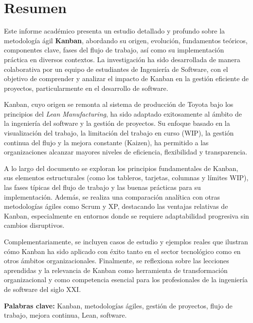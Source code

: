 \section*{Resumen}

Este informe académico presenta un estudio detallado y profundo sobre la metodología ágil \textbf{Kanban}, abordando su origen, evolución, fundamentos teóricos, componentes clave, fases del flujo de trabajo, así como su implementación práctica en diversos contextos. La investigación ha sido desarrollada de manera colaborativa por un equipo de estudiantes de Ingeniería de Software, con el objetivo de comprender y analizar el impacto de Kanban en la gestión eficiente de proyectos, particularmente en el desarrollo de software.

Kanban, cuyo origen se remonta al sistema de producción de Toyota bajo los principios del \textit{Lean Manufacturing}, ha sido adaptado exitosamente al ámbito de la ingeniería del software y la gestión de proyectos. Su enfoque basado en la visualización del trabajo, la limitación del trabajo en curso (WIP), la gestión continua del flujo y la mejora constante (Kaizen), ha permitido a las organizaciones alcanzar mayores niveles de eficiencia, flexibilidad y transparencia.

A lo largo del documento se exploran los principios fundamentales de Kanban, sus elementos estructurales (como los tableros, tarjetas, columnas y límites WIP), las fases típicas del flujo de trabajo y las buenas prácticas para su implementación. Además, se realiza una comparación analítica con otras metodologías ágiles como Scrum y XP, destacando las ventajas relativas de Kanban, especialmente en entornos donde se requiere adaptabilidad progresiva sin cambios disruptivos.

Complementariamente, se incluyen casos de estudio y ejemplos reales que ilustran cómo Kanban ha sido aplicado con éxito tanto en el sector tecnológico como en otros ámbitos organizacionales. Finalmente, se reflexiona sobre las lecciones aprendidas y la relevancia de Kanban como herramienta de transformación organizacional y como competencia esencial para los profesionales de la ingeniería de software del siglo XXI.

\vspace{0.5cm}
\noindent\textbf{Palabras clave:} Kanban, metodologías ágiles, gestión de proyectos, flujo de trabajo, mejora continua, Lean, software.
